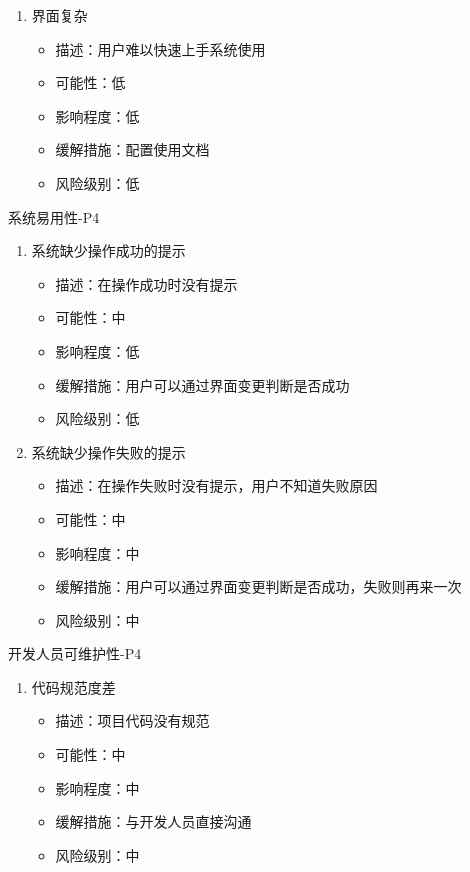 \documentclass[hyperref, a4paper]{ctexart}
\providecommand{\tightlist}{%
  \setlength{\itemsep}{0pt}\setlength{\parskip}{0pt}}
\begin{document}
\begin{enumerate}
\def\labelenumi{\arabic{enumi}.}
\tightlist
\item
  界面复杂

  \begin{itemize}
  \tightlist
  \item
    描述：用户难以快速上手系统使用
  \item
    可能性：低
  \item
    影响程度：低
  \item
    缓解措施：配置使用文档
  \item
    风险级别：低
  \end{itemize}
\end{enumerate}

系统易用性-P4

\begin{enumerate}
\def\labelenumi{\arabic{enumi}.}
\tightlist
\item
  系统缺少操作成功的提示

  \begin{itemize}
  \tightlist
  \item
    描述：在操作成功时没有提示
  \item
    可能性：中
  \item
    影响程度：低
  \item
    缓解措施：用户可以通过界面变更判断是否成功
  \item
    风险级别：低
  \end{itemize}
\item
  系统缺少操作失败的提示

  \begin{itemize}
  \tightlist
  \item
    描述：在操作失败时没有提示，用户不知道失败原因
  \item
    可能性：中
  \item
    影响程度：中
  \item
    缓解措施：用户可以通过界面变更判断是否成功，失败则再来一次
  \item
    风险级别：中
  \end{itemize}
\end{enumerate}

开发人员可维护性-P4

\begin{enumerate}
\def\labelenumi{\arabic{enumi}.}
\tightlist
\item
  代码规范度差

  \begin{itemize}
  \tightlist
  \item
    描述：项目代码没有规范
  \item
    可能性：中
  \item
    影响程度：中
  \item
    缓解措施：与开发人员直接沟通
  \item
    风险级别：中
  \end{itemize}
\end{enumerate}
\end{document}
